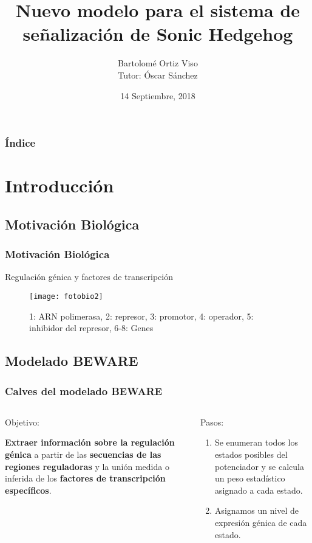 \documentclass{beamer}
\title[Sonic Hedgehog signaling system]{
  Nuevo modelo para el sistema de señalización de Sonic Hedgehog}
\subtitle{}
\author[Bartolomé Ortiz Viso]{
  Bartolomé Ortiz Viso \\\medskip
  {\small Tutor: Óscar Sánchez} }
\institute[Universidad de Granada]{
  Trabajo Fin de Máster  \\
  Máster en Física y Matemáticas}
\date[14 Septiembre, 2018]{
  14 Septiembre, 2018}
\begin{document}
\begin{frame}
  \titlepage
\end{frame}

\begin{frame}
  \frametitle{Índice}
  \tableofcontents
\end{frame}

\section{Introducción}

\subsection{Motivación Biológica}
\begin{frame}
  \frametitle{Motivación Biológica}
\begin{center}
	Regulación génica y factores de transcripción
	
	\begin{figure}[h]
		\texttt{[image: fotobio2]}
		\centering
		\caption{\small{1: ARN polimerasa, 2: represor, 3: promotor, 4: operador, 5: inhibidor del represor, 6-8: Genes}}
	\end{figure} 
\end{center}
\end{frame}

\subsection{Modelado BEWARE}
\begin{frame}
\frametitle{Calves del modelado BEWARE}
\begin{columns}
	\begin{column}{0.5\textwidth}
		{Objetivo:}
		
		\textbf{Extraer información sobre la regulación génica} a partir de las \textbf{secuencias de las regiones reguladoras} y la unión medida o inferida de los\textbf{ factores de transcripción específicos}.
		
	\end{column}
	\begin{column}{0.5\textwidth}
		 {Pasos:}
		
		\begin{enumerate}
			\item  Se enumeran todos los estados posibles del potenciador y se calcula un peso estadístico asignado a cada estado.
			\item Asignamos un nivel de expresión génica de cada estado.
		\end{enumerate}
	\end{column}
\end{columns}


\end{frame}
\end{document}
